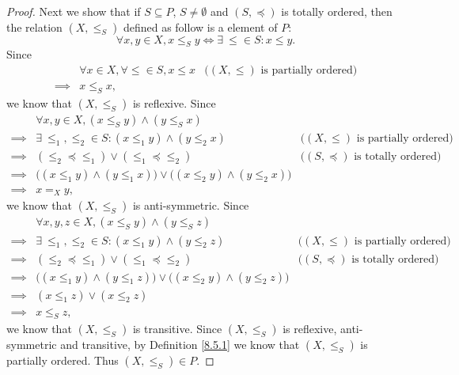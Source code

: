 \begin{proof}
    Next we show that if \(S \subseteq P\), \(S \neq \emptyset\) and \((S, \preceq)\) is totally ordered, then the relation \((X, \leq_S)\) defined as follow is a element of \(P\):
    \[
        \forall x, y \in X, x \leq_S y \iff \exists\ \leq \in S : x \leq y.
    \]
    Since
    \begin{align*}
                 & \forall x \in X, \forall \leq \in S, x \leq x & \text{(\((X, \leq)\) is partially ordered)} \\
        \implies & x \leq_S x,
    \end{align*}
    we know that \((X, \leq_S)\) is reflexive.
    Since
    \begin{align*}
                 & \forall x, y \in X, (x \leq_S y) \land (y \leq_S x)                                                                                     \\
        \implies & \exists\ \leq_1, \leq_2 \in S : (x \leq_1 y) \land (y \leq_2 x)                          & \text{(\((X, \leq)\) is partially ordered)}  \\
        \implies & (\leq_2 \preceq \leq_1) \lor (\leq_1 \preceq \leq_2)                                     & \text{(\((S, \preceq)\) is totally ordered)} \\
        \implies & \big((x \leq_1 y) \land (y \leq_1 x)\big) \lor \big((x \leq_2 y) \land (y \leq_2 x)\big)                                                \\
        \implies & x =_X y,
    \end{align*}
    we know that \((X, \leq_S)\) is anti-symmetric.
    Since
    \begin{align*}
                 & \forall x, y, z \in X, (x \leq_S y) \land (y \leq_S z)                                                                                  \\
        \implies & \exists\ \leq_1, \leq_2 \in S : (x \leq_1 y) \land (y \leq_2 z)                          & \text{(\((X, \leq)\) is partially ordered)}  \\
        \implies & (\leq_2 \preceq \leq_1) \lor (\leq_1 \preceq \leq_2)                                     & \text{(\((S, \preceq)\) is totally ordered)} \\
        \implies & \big((x \leq_1 y) \land (y \leq_1 z)\big) \lor \big((x \leq_2 y) \land (y \leq_2 z)\big)                                                \\
        \implies & (x \leq_1 z) \lor (x \leq_2 z)                                                                                                          \\
        \implies & x \leq_S z,
    \end{align*}
    we know that \((X, \leq_S)\) is transitive.
    Since \((X, \leq_S)\) is reflexive, anti-symmetric and transitive, by Definition \ref{8.5.1} we know that \((X, \leq_S)\) is partially ordered.
    Thus \((X, \leq_S) \in P\).


\end{proof}
